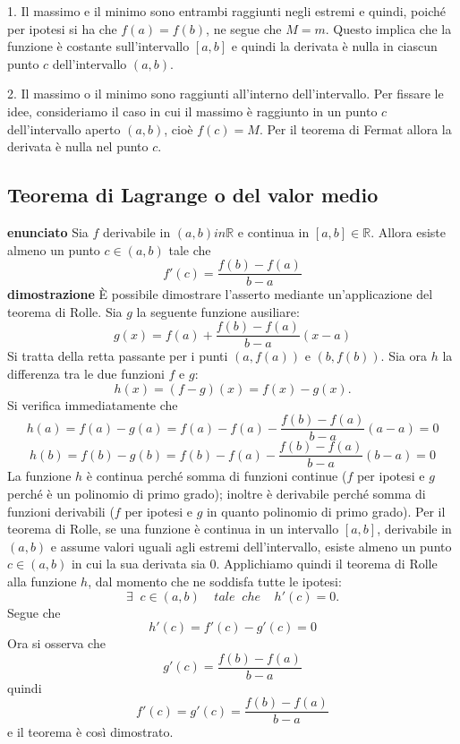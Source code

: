 \documentclass[a4paper, 9pt]{report}
\begin{document}
1. Il massimo e il minimo sono entrambi raggiunti negli estremi e quindi, poiché per ipotesi si ha che $f(a)=f(b)$, ne segue che $M=m$. Questo implica che la funzione è costante sull'intervallo $[a,b]$ e quindi la derivata è nulla in ciascun punto $c$ dell'intervallo $(a,b)$.


2. Il massimo o il minimo sono raggiunti all'interno dell'intervallo. Per fissare le idee, consideriamo il caso in cui il massimo è raggiunto in un punto $c$ dell'intervallo aperto $(a,b)$, cioè $f(c)=M$. Per il teorema di Fermat allora la derivata è nulla nel punto $c$.






\newpage
\subsection*{Teorema di Lagrange o del valor medio}
\textbf{enunciato}\newline
Sia $f$ derivabile in $(a,b) in \mathbb{R}$ e continua in $[a,b] \in \mathbb{R}$. Allora esiste almeno un punto $c \in (a,b)$ tale che 
\[
    f'(c) = \frac{f(b)-f(a)}{b-a}
\]
\textbf{dimostrazione}\newline
È possibile dimostrare l'asserto mediante un'applicazione del teorema di Rolle.\newline
Sia $g$ la seguente funzione ausiliare:
\[
    g(x)=f(a)+\frac{f(b)-f(a)}{b-a}(x-a)
\] 
Si tratta della retta passante per i punti $(a,f(a))$ e $(b,f(b))$.\newline
Sia ora $h$ la differenza tra le due funzioni $f$ e $g$:
\[
    h(x) = (f-g)(x) = f(x) - g(x).
\]
Si verifica immediatamente che
\[
    h(a) = f(a) - g(a) = f(a) - f(a) - \frac{f(b) - f(a)}{b-a}(a-a)= 0
\]
\[
    h(b) = f(b) - g(b) = f(b) - f(a) - \frac{f(b) - f(a)}{b-a}(b-a) = 0
\]
La funzione $h$ è continua perché somma di funzioni continue ($f$ per ipotesi e $g$ perché è un polinomio di primo grado); inoltre è derivabile perché somma di funzioni derivabili ($f$ per ipotesi e $g$ in quanto polinomio di primo grado).\newline
Per il teorema di Rolle, se una funzione è continua in un intervallo $[a,b]$, derivabile in $(a,b)$ e assume valori uguali agli estremi dell'intervallo, esiste almeno un punto $c\in (a,b)$ in cui la sua derivata sia $0$.\newline
Applichiamo quindi il teorema di Rolle alla funzione $h$, dal momento che ne soddisfa tutte le ipotesi:
\[
    \exists \;\; c\in (a,b) \;\;\;\;tale \;\; che \;\;\;\; h'(c)=0.
\]
Segue che
\[
    h'(c)=f'(c)-g'(c)=0
\]
Ora si osserva che
\[
    g'(c) = \frac{f(b) - f(a)}{b-a}  
\]
quindi
\[
    f'(c) = g'(c) =  \frac{f(b) - f(a)}{b-a}
\]
e il teorema è così dimostrato.
\end{document}

